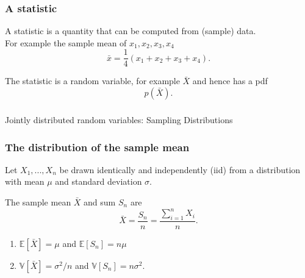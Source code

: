 \begin{frame}[fragile]\frametitle{A statistic}
\begin{defn}
A statistic is a quantity that can be computed from (sample) data. \\ 
For example the sample mean of $x_1,x_2,x_3,x_4$
$$\bar{x} = \frac{1}{4}(x_1+x_2+x_3+x_4).$$  

\vspace{.1in}

The statistic is a random variable, for example $\bar{X}$ and hence
has a pdf $$p(\bar{X}).$$

\end{defn}

\end{frame}

\begin{frame}[fragile]\frametitle{}
\begin{center}
{\Large Jointly distributed random variables: Sampling Distributions}

\end{center}
\end{frame}



\begin{frame}[fragile]\frametitle{The distribution of the sample mean}

\begin{prop}
Let $X_1,...,X_n$ be drawn identically and independently (iid)
from a distribution with mean $\mu$ and standard deviation
$\sigma$. 

\vspace{.1in}

The sample mean $\bar{X}$ and sum $S_n$ are
$$\bar{X} = \frac{S_n}{n} = \frac{\sum_{i=1}^n X_i}{n}.$$ 

\vspace{.1in}

\begin{enumerate}

\item $\mathbb E[\bar{X}] = \mu$ and $\mathbb E[S_n] = n \mu$ 

\item $\mathbb V[\bar{X}] = \sigma^2/n$ and $\mathbb V[S_n] = n \sigma^{2}$.

\end{enumerate}

\end{prop}

\end{frame}



